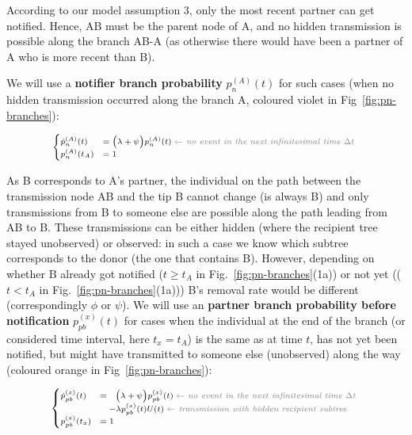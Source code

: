 \documentclass[a4paper,10pt]{article}
\begin{document}
According to our model assumption 3, only the most recent partner can get notified. Hence, AB must be the parent node of A, and no hidden transmission is possible along the branch AB-A (as otherwise there would have been a partner of A who is more recent than B).

We will use a \textbf{notifier branch probability} $p_n^{(A)}(t)$ for such cases (when no hidden transmission occurred along the branch A, coloured violet in Fig~\ref{fig:pn-branches}):

\begin{equation}
\scriptsize
\begin{cases}
\dot{p}_n^{(A)}(t) &=  \Big(\lambda + \psi\Big) p_n^{(A)}(t)\; \textit{\color{gray} $\leftarrow$ no event in the next infinitesimal time $\Delta t$ }\\
p_n^{(A)}(t_A) &= 1\label{eq:p-n}
\end{cases}
\end{equation}

As B corresponds to A's partner, the individual on the path between the transmission node AB and the tip B cannot change (is always B) and 
only transmissions from B to someone else are possible along the path leading from AB to B. These transmissions can be either hidden (where the recipient tree stayed unobserved) or observed: in such a case we know which subtree corresponds to the donor (the one that contains B). However, depending on whether B already got notified ($t \geq t_A$ in Fig.~\ref{fig:pn-branches}(1a)) or not yet (($t < t_A$ in Fig.~\ref{fig:pn-branches}(1a))) B's removal rate would be different (correspondingly $\phi$ or $\psi$). We will use an \textbf{partner branch probability before notification} $p_{pb}^{(x)}(t)$ for cases when the individual at the end of the branch (or considered time interval, here $t_x=t_A$) is the same as at time $t$, has not yet been notified, but might have transmitted to someone else (unobserved) along the way (coloured orange in Fig~\ref{fig:pn-branches}):

\begin{equation}
\scriptsize
\begin{cases}
\dot{p}_{pb}^{(x)}(t) &=~~  \Big(\lambda + \psi\Big) p_{pb}^{(x)}(t)\; \textit{\color{gray} $\leftarrow$ no event in the next infinitesimal time $\Delta t$ }\\
    &~~~ - \lambda p_{pb}^{(x)}(t)U(t)\;  \textit{\color{gray} $\leftarrow$ transmission with hidden recipient subtree}\\
p_{pb}^{(x)}(t_x) &=  1\label{eq:p-o}
\end{cases}
\end{equation}
\end{document}

